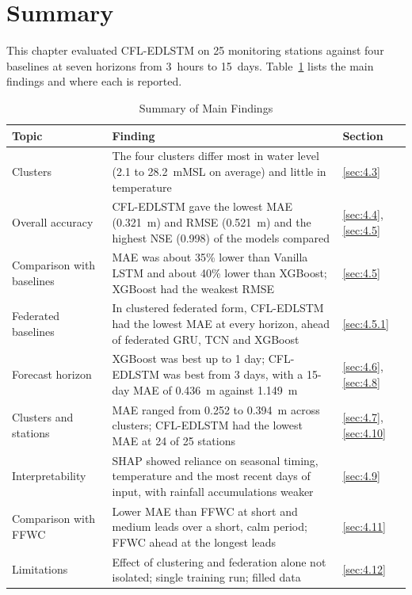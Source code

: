 \section{Summary}
\label{sec:4.14}

This chapter evaluated CFL-EDLSTM on 25 monitoring stations against four
baselines at seven horizons from 3~hours to 15~days. Table~\ref{tab:4.summary}
lists the main findings and where each is reported.

\begin{table}[htbp]
  \centering
  \caption{Summary of Main Findings}
  \label{tab:4.summary}
  \small
  \renewcommand{\arraystretch}{1.2}
  \begin{tabularx}{\textwidth}{@{}p{3.1cm} X p{1.5cm}@{}}
    \toprule
    \textbf{Topic} & \textbf{Finding} & \textbf{Section} \\
    \midrule
    Clusters & The four clusters differ most in water level (2.1 to 28.2~mMSL on average) and little in temperature & \ref{sec:4.3} \\
    Overall accuracy & CFL-EDLSTM gave the lowest MAE (0.321~m) and RMSE (0.521~m) and the highest NSE (0.998) of the models compared & \ref{sec:4.4}, \ref{sec:4.5} \\
    Comparison with baselines & MAE was about 35\% lower than Vanilla LSTM and about 40\% lower than XGBoost; XGBoost had the weakest RMSE & \ref{sec:4.5} \\
    Federated baselines & In clustered federated form, CFL-EDLSTM had the lowest MAE at every horizon, ahead of federated GRU, TCN and XGBoost & \ref{sec:4.5.1} \\
    Forecast horizon & XGBoost was best up to 1 day; CFL-EDLSTM was best from 3 days, with a 15-day MAE of 0.436~m against 1.149~m & \ref{sec:4.6}, \ref{sec:4.8} \\
    Clusters and stations & MAE ranged from 0.252 to 0.394~m across clusters; CFL-EDLSTM had the lowest MAE at 24 of 25 stations & \ref{sec:4.7}, \ref{sec:4.10} \\
    Interpretability & SHAP showed reliance on seasonal timing, temperature and the most recent days of input, with rainfall accumulations weaker & \ref{sec:4.9} \\
    Comparison with FFWC & Lower MAE than FFWC at short and medium leads over a short, calm period; FFWC ahead at the longest leads & \ref{sec:4.11} \\
    Limitations & Effect of clustering and federation alone not isolated; single training run; filled data & \ref{sec:4.12} \\
    \bottomrule
  \end{tabularx}
\end{table}

